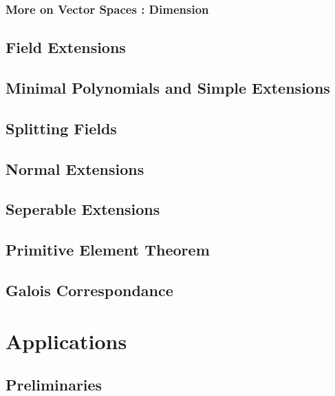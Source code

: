 \documentclass[oneside]{book}
\theoremstyle{lemmastyle}
\theoremstyle{definitionstyle}
\theoremstyle{exercisestyle}
\theoremstyle{claimstyle}
\newcommand{\<}{\langle}
\renewcommand{\>}{\rangle}
\begin{document}
        \section{More on Vector Spaces : Dimension}
            

    \chapter{Field Extensions}
        

    \chapter{Minimal Polynomials and Simple Extensions}
        

    \chapter{Splitting Fields}
        

    \chapter{Normal Extensions}
        

    \chapter{Seperable Extensions}
        
        
    \chapter{Primitive Element Theorem}
        

    \chapter{Galois Correspondance}
        
        
\part{Applications}
    
    \chapter{Preliminaries}
        
\end{document}
